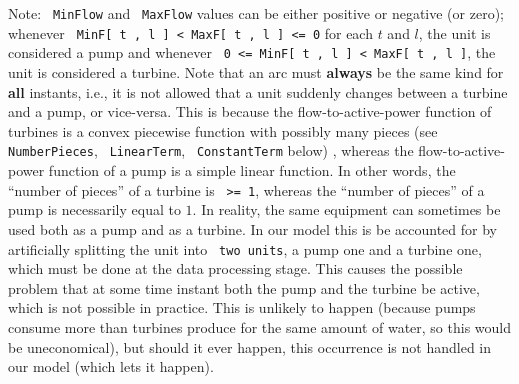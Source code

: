 \documentclass[a4paper]{article}
\newcommand{\code}[1]{\textrm{\texttt{\hyphenchar\font=200 #1}}}
\newcommand{\cstr}[1]{\code{#1}}
\newcommand{\highlight}[1]{{\bf #1}}
\begin{document}
\smallskip
\noindent
Note: \cstr{MinFlow} and \cstr{MaxFlow} values can be either positive or negative (or zero); whenever \code{MinF[ t , l ] < MaxF[ t , l ] <= 0} for each $t$ and $l$, the unit is considered a pump and whenever \code{0 <= MinF[ t , l ] < MaxF[ t , l ]}, the unit is considered a turbine. Note that an arc must \highlight{always} be the same kind for \highlight{all} instants, i.e., it is not allowed that a unit suddenly changes between a turbine and a pump, or vice-versa. This is because the flow-to-active-power function of turbines is a convex piecewise function with possibly many pieces (see \cstr{NumberPieces}, \cstr{LinearTerm}, \cstr{ConstantTerm} below) , whereas the flow-to-active-power function of a pump is a simple linear function. In other words, the ``number of pieces'' of a turbine is \code{>= 1}, whereas the ``number of pieces'' of a pump is necessarily equal to $1$. In reality, the same equipment can sometimes be used both as a pump and as a turbine. In our model this is be accounted for by artificially splitting the unit into \cstr{two units}, a pump one and a turbine one, which must be done at the data processing stage. This causes the possible problem that at some time instant both the pump and the turbine be active, which is not possible in practice. This is unlikely to happen (because pumps consume more than turbines produce for the same amount of water, so this would be uneconomical), but should it ever happen, this occurrence is not handled in our model (which lets it happen).
\end{document}
